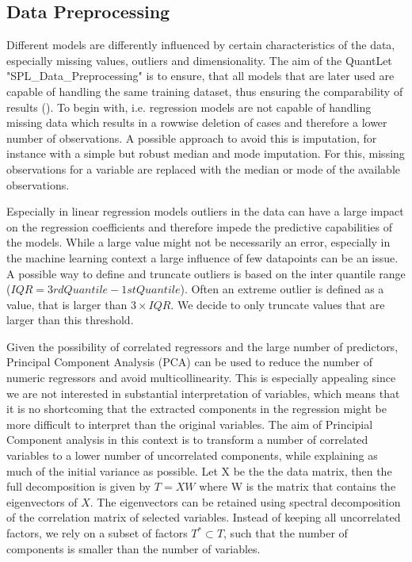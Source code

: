 \subsection{Data Preprocessing}\label{sec:data_theory}

Different models are differently influenced by certain characteristics of the data, especially missing values, outliers and dimensionality.  The aim of the QuantLet "SPL_Data_Preprocessing" is to ensure, that all models that are later used are capable of handling the same training dataset, thus ensuring the comparability of results (\cite{friedman_elements_2001}). 
To begin with, i.e. regression models are not capable of handling missing data which results in a rowwise deletion of cases and therefore a lower number of observations. A possible approach to avoid this is  imputation, for instance with a simple but robust median and mode imputation. For this, missing observations for a variable are replaced with the median or mode of the available observations.

Especially in linear regression models outliers in the data can have a large impact on the regression coefficients and therefore impede the predictive  capabilities of the  models. While a large value might not be necessarily an error, especially in the machine learning context a large influence of few datapoints can be an issue. A possible way to define and truncate outliers is based on the inter quantile range ($IQR = 3rd Quantile -1st Quantile$).
Often an extreme outlier is defined as a value, that is larger than $3 \times IQR$. We decide to only truncate values that are larger than this threshold. 

Given the possibility of correlated regressors and the large number of predictors, Principal Component Analysis (PCA) can be used to reduce the number of numeric regressors and avoid multicollinearity. This is especially appealing since we are not interested in substantial interpretation of variables, which means that it is no shortcoming that the extracted components in the regression might be more difficult to interpret than the original variables. 
The aim of Principial Component analysis in this context is to transform a number of correlated variables to a lower number of uncorrelated components, while explaining as much of the initial variance as possible. 
Let X be the the data matrix, then the full decomposition is given by   $  T = XW $
where W is the matrix that contains the eigenvectors of $X$.  
The eigenvectors can be retained using spectral decomposition of the correlation matrix of selected variables.
Instead of keeping all uncorrelated factors, we rely on a subset of factors $T^* \subset T$, such that the number of components is smaller than the number of variables.
 
